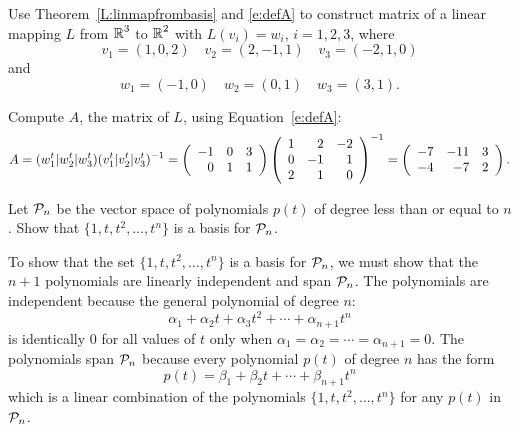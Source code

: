 \documentclass{ximera}
\begin{document}
\EXER

\TEXER

\begin{exercise} \label{c7.2.1}
Use Theorem~\ref{L:linmapfrombasis} and \eqref{e:defA} to 
construct matrix of a linear mapping $L$ from $\mbox{$\Bbb{R}$}^3$ to $\mbox{$\Bbb{R}$}^2$ with $L(v_i)=w_i$, $i=1,2,3$, where
\[
v_1=(1,0,2)\quad v_2=(2,-1,1) \quad v_3=(-2,1,0)
\]
and
\[
w_1=(-1,0) \quad w_2=(0,1) \quad w_3=(3,1).
\]

\begin{solution}

Compute $A$, the matrix of $L$, using Equation~\eqref{e:defA}:
\[ A = (w_1^t|w_2^t|w_3^t)(v_1^t|v_2^t|v_3^t)^{-1} =
\left(\begin{array}{rrr} -1 & 0 & 3 \\ 0 & 1 & 1 \end{array}\right)
\left(\begin{array}{rrr} 1 & 2 & -2 \\ 0 & -1 & 1 \\ 2 & 1 & 0\end{array}\right)^{-1} =
\left(\begin{array}{rrr} -7 & -11 & 3 \\ -4 & -7 & 2
\end{array}\right). \]

\end{solution}
\end{exercise}

\begin{exercise}  \label{c7.2.2}
Let ${\cal P}_n$ be the vector space of polynomials $p(t)$ of
degree less than or equal to $n$.  Show that $\{1,t,t^2,\ldots,t^n\}$ is a
basis for ${\cal P}_n$.

\begin{solution}

To show that the set $\{1,t,t^2,\dots,t^n\}$ is a basis for
${\cal P}_n$, we must show that the $n + 1$ polynomials are
linearly independent and span ${\cal P}_n$.  The polynomials are
independent because the general polynomial of degree $n$:
\[
\alpha_1 + \alpha_2t + \alpha_3t^2 + \cdots + \alpha_{n+1}t^n
\]
is identically $0$ for all values of $t$ only when $\alpha_1 =
\alpha_2 = \cdots = \alpha_{n + 1} = 0$.  The polynomials span
${\cal P}_n$ because every polynomial $p(t)$ of degree $n$ has
the form
\[ p(t) = \beta_1 + \beta_2t + \cdots + \beta_{n + 1}t^n \]
which is a linear combination of the polynomials
$\{1,t,t^2,\dots,t^n\}$ for any $p(t)$ in ${\cal P}_n$.

\end{solution}
\end{exercise}
\end{document}
